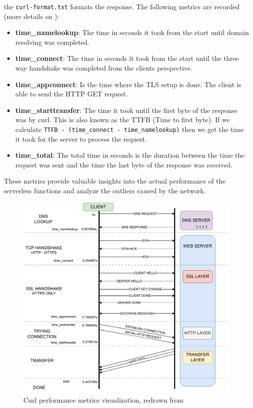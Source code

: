 the \texttt{curl-format.txt} formats the response. The following metrics are recorded (more details on \cite{speedtestdemon_2021_cheat}):

\begin{itemize}
    \item \textbf{time\_namelookup}: The time in seconds it took from the start until domain resolving was completed.
    \item \textbf{time\_connect}: The time in seconds it took from the start until the three way handshake was completed from the clients perspective.
    \item \textbf{time\_appconnect}: Is the time where the TLS setup is done. The client is able to send the HTTP GET request.
    \item \textbf{time\_starttransfer}: The time it took until the first byte of the response was by curl. This is also known as the TTFB (Time to first byte). If we calculate \texttt{TTFB - (time\_connect - time\_namelookup)} then we get the time it took for the server to process the request.
    \item \textbf{time\_total}: The total time in seconds is the duration between the time the request was sent and the time the last byte of the response was received.
\end{itemize}

These metrics provide valuable insights into the actual performance of the serverless functions and analyze the outliers caused by the network.


\begin{figure}[htbp]
    \centering
        \includegraphics[width=1\linewidth]{images/evaluation/curl_performance_metrics.drawio.pdf}
    \caption{Curl performance metrics visualization, redrawn from \cite{speedtestdemon_2021_cheat}}
    \label{fig:eval:curl-metrics}
\end{figure}

